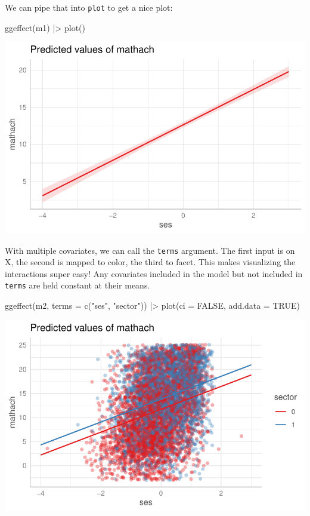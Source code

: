 \documentclass[
  letterpaper,
  DIV=11,
  numbers=noendperiod]{scrreprt}
\newenvironment{Shaded}{}{}
\newcommand{\AttributeTok}[1]{\textcolor[rgb]{0.49,0.56,0.16}{#1}}
\newcommand{\ConstantTok}[1]{\textcolor[rgb]{0.53,0.00,0.00}{#1}}
\newcommand{\FunctionTok}[1]{\textcolor[rgb]{0.02,0.16,0.49}{#1}}
\newcommand{\NormalTok}[1]{#1}
\newcommand{\SpecialCharTok}[1]{\textcolor[rgb]{0.25,0.44,0.63}{#1}}
\newcommand{\StringTok}[1]{\textcolor[rgb]{0.25,0.44,0.63}{#1}}
\begin{document}
We can pipe that into \texttt{plot} to get a nice plot:

\begin{Shaded}
\begin{Highlighting}[]
\FunctionTok{ggeffect}\NormalTok{(m1) }\SpecialCharTok{|\textgreater{}} 
  \FunctionTok{plot}\NormalTok{()}
\end{Highlighting}
\end{Shaded}

\includegraphics{ggeffects_files/figure-pdf/unnamed-chunk-5-1.pdf}

With multiple covariates, we can call the \texttt{terms} argument. The
first input is on X, the second is mapped to color, the third to facet.
This makes visualizing the interactions super easy! Any covariates
included in the model but not included in \texttt{terms} are held
constant at their means.

\begin{Shaded}
\begin{Highlighting}[]
\FunctionTok{ggeffect}\NormalTok{(m2, }\AttributeTok{terms =} \FunctionTok{c}\NormalTok{(}\StringTok{"ses"}\NormalTok{, }\StringTok{"sector"}\NormalTok{)) }\SpecialCharTok{|\textgreater{}} 
  \FunctionTok{plot}\NormalTok{(}\AttributeTok{ci =} \ConstantTok{FALSE}\NormalTok{, }\AttributeTok{add.data =} \ConstantTok{TRUE}\NormalTok{)}
\end{Highlighting}
\end{Shaded}

\includegraphics{ggeffects_files/figure-pdf/unnamed-chunk-6-1.pdf}
\end{document}
